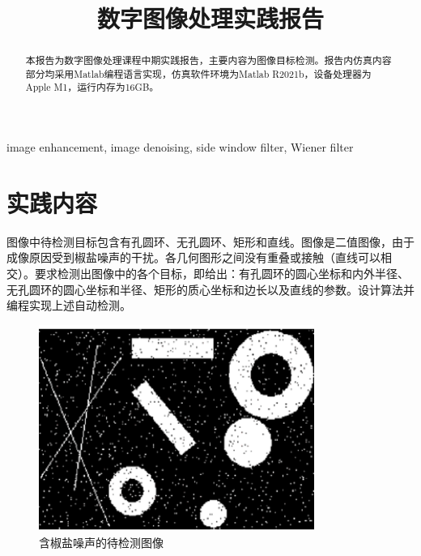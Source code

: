 \documentclass[conference]{IEEEtran}
\begin{document}
\title{数字图像处理实践报告}

\author{
}

\maketitle

\begin{abstract}
本报告为数字图像处理课程中期实践报告，主要内容为图像目标检测。报告内仿真内容部分均采用Matlab编程语言实现，仿真软件环境为Matlab R2021b，设备处理器为Apple M1，运行内存为16GB。
\end{abstract}

\begin{IEEEkeywords}
    image enhancement, image denoising, side window filter, Wiener filter
\end{IEEEkeywords}

\section{实践内容}
图像中待检测目标包含有孔圆环、无孔圆环、矩形和直线。图像是二值图像，由于成像原因受到椒盐噪声的干扰。各几何图形之间没有重叠或接触（直线可以相交）。要求检测出图像中的各个目标，即给出：有孔圆环的圆心坐标和内外半径、无孔圆环的圆心坐标和半径、矩形的质心坐标和边长以及直线的参数。设计算法并编程实现上述自动检测。

\begin{figure}[htbp]
	\centerline{
		\includegraphics[width=9cm]{1.png} 	
	}
	\caption{含椒盐噪声的待检测图像}
	\label{pic1}
\end{figure}
\end{document}
